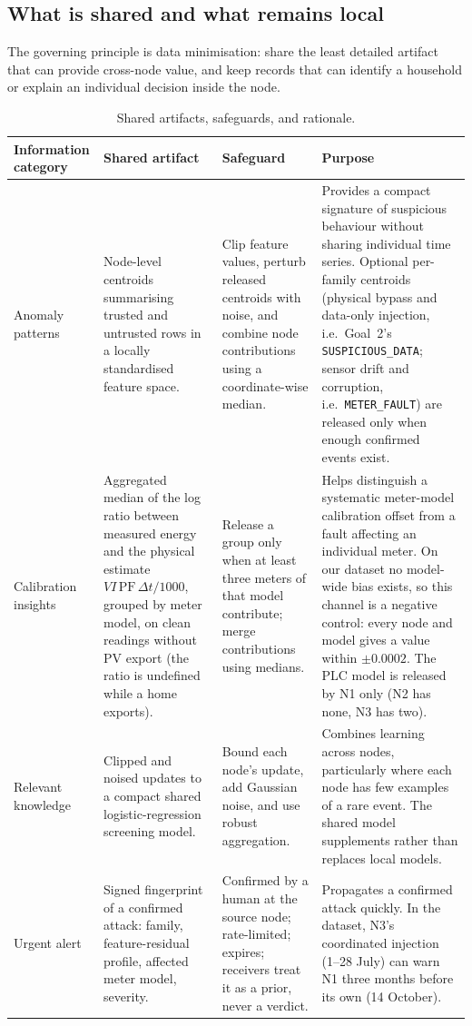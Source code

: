 \subsection{What is shared and what remains local}
The governing principle is data minimisation: share the least detailed artifact that can provide cross-node value, and keep records that can identify a household or explain an individual decision inside the node.

\begin{table}[htbp]
\centering
\small
\caption{Shared artifacts, safeguards, and rationale.}
\label{tab:goal4-sharing}
\begin{tabularx}{\textwidth}{@{}p{2.5cm} p{4.0cm} p{3.5cm} X@{}}
\toprule
Information category & Shared artifact & Safeguard & Purpose \\
\midrule
Anomaly patterns & Node-level centroids summarising trusted and untrusted rows in a locally standardised feature space. & Clip feature values, perturb released centroids with noise, and combine node contributions using a coordinate-wise median. & Provides a compact signature of suspicious behaviour without sharing individual time series. Optional per-family centroids (physical bypass and data-only injection, i.e.\ Goal~2's \texttt{SUSPICIOUS\_DATA}; sensor drift and corruption, i.e.\ \texttt{METER\_FAULT}) are released only when enough confirmed events exist. \\
\addlinespace
Calibration insights & Aggregated median of the log ratio between measured energy and the physical estimate $V I\,\mathrm{PF}\,\Delta t/1000$, grouped by meter model, on clean readings without PV export (the ratio is undefined while a home exports). & Release a group only when at least three meters of that model contribute; merge contributions using medians. & Helps distinguish a systematic meter-model calibration offset from a fault affecting an individual meter. On our dataset no model-wide bias exists, so this channel is a negative control: every node and model gives a value within $\pm0.0002$. The PLC model is released by N1 only (N2 has none, N3 has two). \\
\addlinespace
Relevant knowledge & Clipped and noised updates to a compact shared logistic-regression screening model. & Bound each node's update, add Gaussian noise, and use robust aggregation. & Combines learning across nodes, particularly where each node has few examples of a rare event. The shared model supplements rather than replaces local models. \\
\addlinespace
Urgent alert & Signed fingerprint of a confirmed attack: family, feature-residual profile, affected meter model, severity. & Confirmed by a human at the source node; rate-limited; expires; receivers treat it as a prior, never a verdict. & Propagates a confirmed attack quickly. In the dataset, N3's coordinated injection (1--28 July) can warn N1 three months before its own (14 October). \\
\bottomrule
\end{tabularx}
\end{table}

